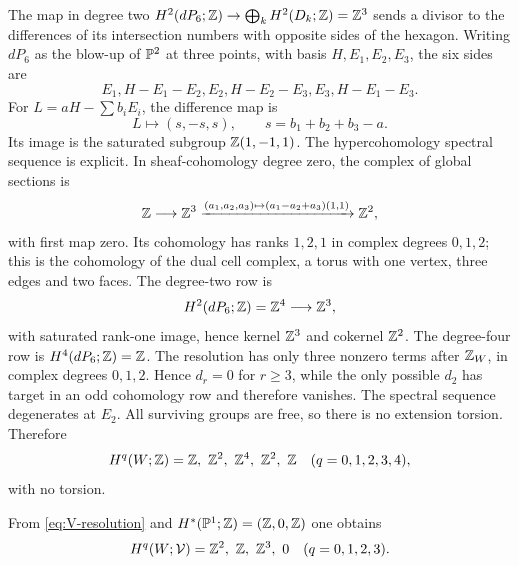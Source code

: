 The map in degree two
$H^2(dP_6;\mathbb Z)\to\bigoplus_kH^2(D_k;\mathbb Z)=\mathbb Z^3$ sends a divisor to the
differences of its intersection numbers with opposite sides of the
hexagon.  Writing $dP_6$ as the blow-up of $\mathbb P^2$ at three points, with
basis $H,E_1,E_2,E_3$, the six sides are
\[
 E_1,
 H-E_1-E_2,
 E_2,
 H-E_2-E_3,
 E_3,
 H-E_1-E_3.
\]
For $L=aH-\sum b_iE_i$, the difference map is
\[
 L\longmapsto(s,-s,s),
 \qquad s=b_1+b_2+b_3-a.
\]
Its image is the saturated subgroup $\mathbb Z(1,-1,1)$.
The hypercohomology spectral sequence is explicit.  In sheaf-cohomology degree zero,
the complex of global sections is
\[
 \mathbb Z\longrightarrow\mathbb Z^3\xrightarrow{(a_1,a_2,a_3)\mapsto
 (a_1-a_2+a_3)(1,1)}\mathbb Z^2,
\]
with first map zero.  Its cohomology has ranks $1,2,1$ in complex degrees
$0,1,2$; this is the cohomology of the dual cell complex, a torus with one
vertex, three edges and two faces.  The degree-two row is
\[
 H^2(dP_6;\mathbb Z)=\mathbb Z^4\longrightarrow\mathbb Z^3,
\]
with saturated rank-one image, hence kernel $\mathbb Z^3$ and cokernel
$\mathbb Z^2$.  The degree-four row is $H^4(dP_6;\mathbb Z)=\mathbb Z$.  The resolution has only
three nonzero terms after $\mathbb Z_W$, in complex degrees $0,1,2$.  Hence
$d_r=0$ for $r\geq3$, while the only possible $d_2$ has target in an odd
cohomology row and therefore vanishes.  The spectral sequence degenerates
at $E_2$.  All surviving groups are free, so there is no extension
torsion.  Therefore
\begin{equation}\label{eq:W-cohomology-ranks}
 H^q(W;\mathbb Z)=\mathbb Z,\ \mathbb Z^2,\ \mathbb Z^4,\ \mathbb Z^2,\ \mathbb Z
 \quad(q=0,1,2,3,4),
\end{equation}
with no torsion.

From \eqref{eq:V-resolution} and $H^*(\mathbb P^1;\mathbb Z)=(\mathbb Z,0,\mathbb Z)$ one obtains
\begin{equation}\label{eq:V-cohomology}
 H^q(W;\mathcal V)=\mathbb Z^2,\ \mathbb Z,\ \mathbb Z^3,\ 0
 \quad(q=0,1,2,3).
\end{equation}

